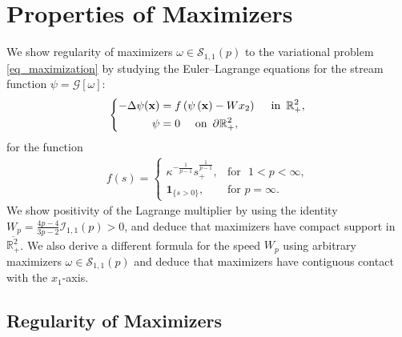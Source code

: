 \documentclass[11pt]{amsart}
\theoremstyle{definition}
\theoremstyle{definition}
\numberwithin{equation}{section}
\newcommand{\0}{\emptyset}
\newcommand{\bfx}{{\bf x}}
\newcommand{\bbR}{\mathbb R}
\newcommand{\calI}{\mathcal I}
\newcommand{\calS}{\mathcal S}
\begin{document}
			
			\section{Properties of Maximizers}\label{sec:maximizer_properties}
			
			We show regularity of maximizers $\omega\in \calS_{1,1}(p)$ to the variational problem \eqref{eq_maximization} by studying the Euler--Lagrange equations for the stream function $\psi=\mathcal{G}[\omega]$:
			\begin{equation}
				\left\{
				\begin{aligned}
					-\Delta \psi (\bfx)&= f\left(\psi \left(\bfx \right) - Wx_2  \right)\quad \textrm{ in }\, \bbR^2_+, \\
					\psi&=0 \quad \textrm{ on }\, \partial\bbR^2_+,
				\end{aligned}
				\right.
				\label{eq_ell}
			\end{equation}
			for the function  
			\begin{equation}    
				\begin{aligned}
					f(s) = \begin{cases}
						\kappa^{-\frac{1}{p-1}} s_+^{\frac{1}{p-1}}, & \text{for }\,\, 1<p<\infty, \\[5pt]
						\mathbf{1}_{\{s > 0\}}, & \text{for}\,\, p = \infty.
					\end{cases}
				\end{aligned}
				\label{f}
			\end{equation}
			We show positivity of the Lagrange multiplier by using the identity $W_p=\frac{4p-4}{3p-2}\calI_{1,1}(p)>0$, and deduce that maximizers have compact support in $\overline{\mathbb{R}^{2}_{+}}$. We also derive a different formula for the speed $W_p$ using arbitrary maximizers $\omega\in \calS_{1,1}(p)$ and deduce that maximizers have contiguous contact with the $x_1$-axis. 
			
			\subsection{Regularity of Maximizers}
			
\end{document}
